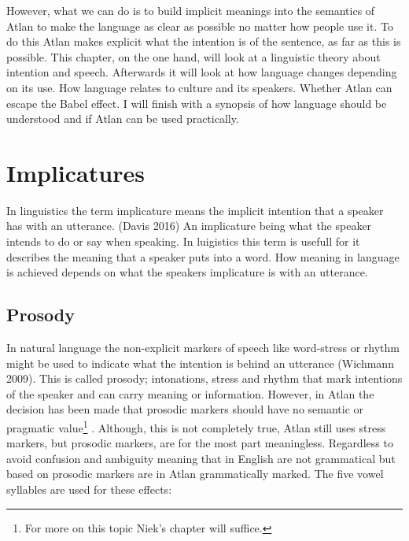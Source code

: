 However, what we can do is to build implicit meanings into the semantics of Atlan to make the language as clear as possible no matter how people use it. To do this Atlan makes explicit what the intention is of the sentence, as far as this is possible. This chapter, on the one hand, will look at a linguistic theory about intention and speech. Afterwards it will look at how language changes depending on its use. How language relates to culture and its speakers. Whether Atlan can escape the Babel effect. I will finish with a synopsis of how language should be understood and if Atlan can be used practically.  

\vspace{-0.5cm}
\section{Implicatures}

In linguistics the term implicature means the implicit intention that a speaker has with an utterance. (Davis 2016) An implicature being what the speaker intends to do or say when speaking. In luigistics this term is usefull for it describes the meaning that a speaker puts into a word. How meaning in language is achieved depends on what the speakers implicature is with an utterance.

\subsection{Prosody}

In natural language the non-explicit markers of speech like word-stress or rhythm might be used to indicate what the intention is behind an utterance (Wichmann 2009). This is called prosody; intonations, stress and rhythm that mark intentions of the speaker and can carry meaning or information. However, in Atlan the decision has been made that prosodic markers should have no semantic or pragmatic value\footnote{For more on this topic Niek’s chapter will suffice.} . Although, this is not completely true, Atlan still uses stress markers, but prosodic markers, are for the most part meaningless. Regardless to avoid confusion and ambiguity meaning that in English are not grammatical but based on prosodic markers are in Atlan grammatically marked. The five vowel syllables are used for these effects:

